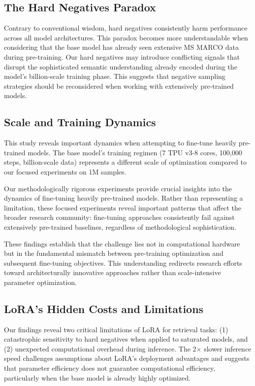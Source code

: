 \documentclass[conference]{IEEEtran}
\begin{document}
\subsection{The Hard Negatives Paradox}
Contrary to conventional wisdom, hard negatives consistently harm performance across all model architectures. This paradox becomes more understandable when considering that the base model has already seen extensive MS MARCO data during pre-training. Our hard negatives may introduce conflicting signals that disrupt the sophisticated semantic understanding already encoded during the model's billion-scale training phase. This suggests that negative sampling strategies should be reconsidered when working with extensively pre-trained models.

\subsection{Scale and Training Dynamics}
This study reveals important dynamics when attempting to fine-tune heavily pre-trained models. The base model's training regimen (7 TPU v3-8 cores, 100,000 steps, billion-scale data) represents a different scale of optimization compared to our focused experiments on 1M samples.

Our methodologically rigorous experiments provide crucial insights into the dynamics of fine-tuning heavily pre-trained models. Rather than representing a limitation, these focused experiments reveal important patterns that affect the broader research community: fine-tuning approaches consistently fail against extensively pre-trained baselines, regardless of methodological sophistication.

These findings establish that the challenge lies not in computational hardware but in the fundamental mismatch between pre-training optimization and subsequent fine-tuning objectives. This understanding redirects research efforts toward architecturally innovative approaches rather than scale-intensive parameter optimization.

\subsection{LoRA's Hidden Costs and Limitations}
Our findings reveal two critical limitations of LoRA for retrieval tasks: (1) catastrophic sensitivity to hard negatives when applied to saturated models, and (2) unexpected computational overhead during inference. The 2× slower inference speed challenges assumptions about LoRA's deployment advantages and suggests that parameter efficiency does not guarantee computational efficiency, particularly when the base model is already highly optimized.
\end{document}
